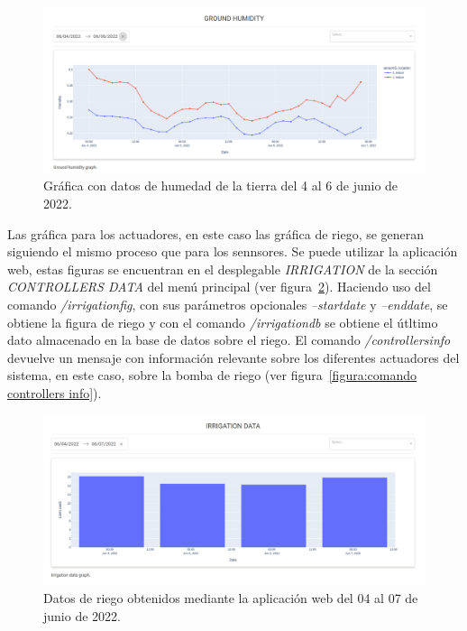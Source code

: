 \documentclass[a4paper, 12pt, oneside]{book}
\begin{document}
\begin{figure}[H]
	\centering
    \includegraphics[width=12cm, keepaspectratio]{img/ground_humidity}
    \caption{Gráfica con datos de humedad de la tierra del 4 al 6 de junio de 2022.}
    \label{figura:humedad tierra}
\end{figure}

Las gráfica para los actuadores, en este caso las gráfica de riego, se generan siguiendo el mismo proceso que para los sennsores. Se puede utilizar la aplicación web, estas figuras se encuentran en el desplegable \textit{IRRIGATION} de la sección \textit{CONTROLLERS DATA} del menú principal (ver figura~\ref{figura:grafica_irrigation_data_04_07_junio}).
Haciendo uso del comando \textit{/irrigationfig}, con sus parámetros opcionales \textit{--startdate} y \textit{--enddate}, se obtiene la figura de riego y con el comando \textit{/irrigationdb} se obtiene el útltimo dato almacenado en la base de datos sobre el riego. El comando \textit{/controllersinfo} devuelve un mensaje con información relevante sobre los diferentes actuadores del sistema, en este caso, sobre la bomba de riego (ver figura~\ref{figura:comando controllers info}).

\begin{figure}[H]
	\centering
    \includegraphics[width=12cm, keepaspectratio]{img/grafica_irrigation_data_04_07_junio}
    \caption{Datos de riego obtenidos mediante la aplicación web del 04 al 07 de junio de 2022.}
    \label{figura:grafica_irrigation_data_04_07_junio}
\end{figure}
\end{document}
